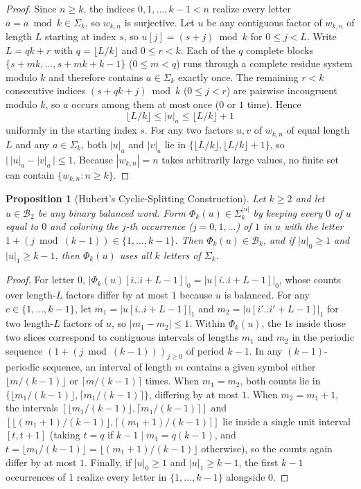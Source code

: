 \documentclass[11pt,a4paper]{article}
\newtheorem{proposition}[theorem]{Proposition}
\theoremstyle{definition}
\begin{document}
\begin{proof}
Since $n \ge k$, the indices $0, 1, \dots, k-1 < n$ realize every letter $a = a \bmod k \in \Sigma_k$, so $w_{k,n}$ is surjective. Let $u$ be any contiguous factor of $w_{k,n}$ of length $L$ starting at index $s$, so $u[j] = (s + j) \bmod k$ for $0 \le j < L$. Write $L = qk + r$ with $q = \lfloor L/k \rfloor$ and $0 \le r < k$. Each of the $q$ complete blocks $\{s + mk, \dots, s + mk + k - 1\}$ ($0 \le m < q$) runs through a complete residue system modulo $k$ and therefore contains $a \in \Sigma_k$ exactly once. The remaining $r < k$ consecutive indices $(s + qk + j) \bmod k$ ($0 \le j < r$) are pairwise incongruent modulo $k$, so $a$ occurs among them at most once ($0$ or $1$ time). Hence
\[
  \lfloor L/k \rfloor \le |u|_a \le \lfloor L/k \rfloor + 1
\]
uniformly in the starting index $s$. For any two factors $u, v$ of $w_{k,n}$ of equal length $L$ and any $a \in \Sigma_k$, both $|u|_a$ and $|v|_a$ lie in $\{\lfloor L/k \rfloor, \lfloor L/k \rfloor + 1\}$, so $\bigl|\,|u|_a - |v|_a\,\bigr| \le 1$. Because $|w_{k,n}| = n$ takes arbitrarily large values, no finite set can contain $\{w_{k,n} : n \ge k\}$.
\end{proof}

\begin{proposition}[Hubert's Cyclic-Splitting Construction]
\label{prop:hubert}
Let $k \ge 2$ and let $u \in \mathcal{B}_2$ be any binary balanced word. Form $\Phi_k(u) \in \Sigma_k^{|u|}$ by keeping every $0$ of $u$ equal to $0$ and coloring the $j$-th occurrence ($j = 0, 1, \dots$) of $1$ in $u$ with the letter $1 + (j \bmod (k - 1)) \in \{1, \dots, k-1\}$. Then $\Phi_k(u) \in \mathcal{B}_k$, and if $|u|_0 \ge 1$ and $|u|_1 \ge k - 1$, then $\Phi_k(u)$ uses all $k$ letters of $\Sigma_k$.
\end{proposition}

\begin{proof}
For letter $0$, $|\Phi_k(u)[i..i+L-1]|_0 = |u[i..i+L-1]|_0$, whose counts over length-$L$ factors differ by at most $1$ because $u$ is balanced. For any $c \in \{1, \dots, k-1\}$, let $m_1 = |u[i..i+L-1]|_1$ and $m_2 = |u[i'..i'+L-1]|_1$ for two length-$L$ factors of $u$, so $|m_1 - m_2| \le 1$. Within $\Phi_k(u)$, the $1$s inside those two slices correspond to contiguous intervals of lengths $m_1$ and $m_2$ in the periodic sequence $(1 + (j \bmod (k-1)))_{j \ge 0}$ of period $k - 1$. In any $(k-1)$-periodic sequence, an interval of length $m$ contains a given symbol either $\lfloor m/(k-1) \rfloor$ or $\lceil m/(k-1) \rceil$ times. When $m_1 = m_2$, both counts lie in $\{\lfloor m_1/(k-1)\rfloor, \lceil m_1/(k-1)\rceil\}$, differing by at most $1$. When $m_2 = m_1 + 1$, the intervals $[\lfloor m_1/(k-1)\rfloor, \lceil m_1/(k-1)\rceil]$ and $[\lfloor (m_1+1)/(k-1)\rfloor, \lceil (m_1+1)/(k-1)\rceil]$ lie inside a single unit interval $[t, t+1]$ (taking $t = q$ if $k - 1 \mid m_1 = q(k-1)$, and $t = \lfloor m_1/(k-1)\rfloor = \lfloor (m_1+1)/(k-1)\rfloor$ otherwise), so the counts again differ by at most $1$. Finally, if $|u|_0 \ge 1$ and $|u|_1 \ge k - 1$, the first $k - 1$ occurrences of $1$ realize every letter in $\{1,\dots,k-1\}$ alongside $0$.
\end{proof}
\end{document}

